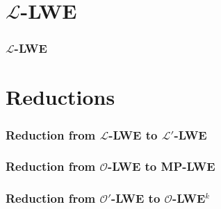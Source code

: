 \documentclass{beamer}
\newcommand{\cL}{\mathcal{L}}
\newcommand{\cO}{\mathcal{O}}
\begin{document}
\section{$\cL$-LWE}
\frame
{
  \frametitle{$\cL$-LWE}

}

\section{Reductions}
\frame
{
  \frametitle{Reduction from $\cL$-LWE to $\cL'$-LWE}

}

\frame
{
  \frametitle{Reduction from $\cO$-LWE to MP-LWE}

}

\frame
{
  \frametitle{Reduction from $\cO'$-LWE to $\cO$-LWE$^k$}

}
\end{document}
